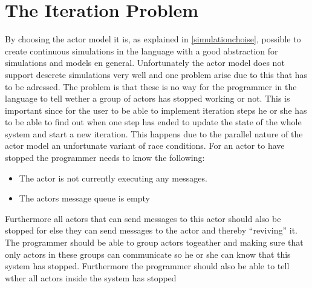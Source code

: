 \section{The Iteration Problem}
By choosing the actor model it is, as explained in \cref{simulationchoise}, possible to create continuous simulations in the language with a good abstraction for simulations and models en general. Unfortunately the actor model does not support descrete simulations very well and one problem arise due to this that has to be adressed.
The problem is that these is no way for the programmer in the language to tell wether a group of actors has stopped working or not. This is important since for the user to be able to implement iteration steps he or she has to be able to find out when one step has ended to update the state of the whole system and start a new iteration. This happens due to the parallel nature of the actor model an unfortunate variant of race conditions.
For an actor to have stopped the programmer needs to know the following:
\begin{itemize}
\item The actor is not currently executing any messages.
\item The actors message queue is empty
\end{itemize}
Furthermore all actors that can send messages to this actor should also be stopped for else they can send messages to the actor and thereby \enquote{reviving} it. The programmer should be able to group actors togeather and making sure that only actors in these groups can communicate so he or she can know that this system has stopped. Furthermore the programmer should also be able to tell wther all actors inside the system has stopped